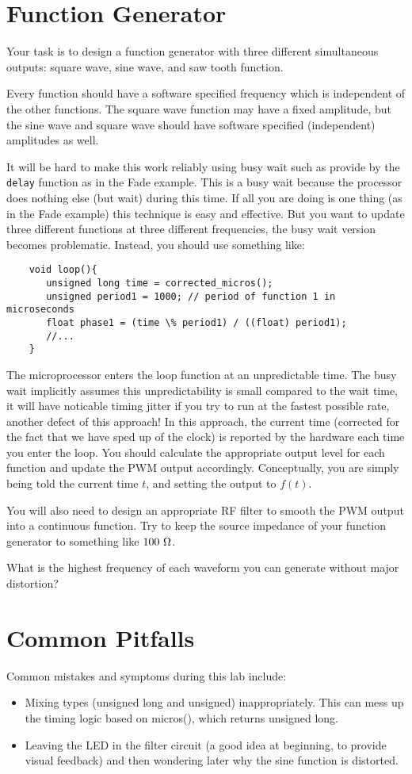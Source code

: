 \documentclass[12pt]{article}
\begin{document}
\section{Function Generator}

Your task is to design a function generator with three different simultaneous outputs:  square wave, sine wave, and saw tooth function.

Every function should have a software specified frequency which is independent of the other functions.
The square wave function may have a fixed amplitude, but the sine wave and square wave should have software specified (independent) amplitudes as well.

It will be hard to make this work reliably using busy wait such as provide by the {\tt delay} function as in the Fade example.  This is a busy wait because the processor does nothing else (but wait) during this time.  If all you are doing is one thing (as in the Fade example) this technique is easy and effective.  But you want to update three different functions at three different frequencies, the busy wait version becomes problematic.  Instead, you should use something like:
\begin{verbatim}
    void loop(){
       unsigned long time = corrected_micros();
       unsigned period1 = 1000; // period of function 1 in microseconds
       float phase1 = (time \% period1) / ((float) period1);
       //...
    }
\end{verbatim}
The microprocessor enters the loop function at an unpredictable time.  The busy wait implicitly assumes this unpredictability is small compared to the wait time, it will have noticable timing jitter if you try to run at the fastest possible rate, another defect of this approach!  In this approach, the current time (corrected for the fact that we have sped up of the clock) is reported by the hardware each time you enter the loop.  You should calculate the appropriate output level for each function and update the PWM output accordingly.  Conceptually, you are simply being told the current time $t$, and setting the output to $f(t)$.  

You will also need to design an appropriate RF filter to smooth the PWM output into a continuous function.
Try to keep the source impedance of your function generator to something like $100~\rm \Omega$.

What is the highest frequency of each waveform you can generate without major distortion?

\section{Common Pitfalls}
Common mistakes and symptoms during this lab include:
\begin{itemize}
\item Mixing types (unsigned long and unsigned) inappropriately.  This can mess up the timing logic based on micros(), which returns unsigned long.
\item Leaving the LED in the filter circuit (a good idea at beginning, to provide visual feedback) and then wondering later why the sine function is distorted.
\end{itemize}
\end{document}

